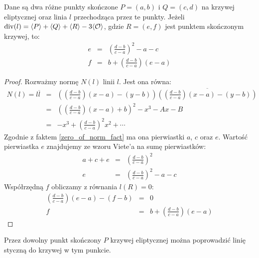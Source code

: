 \begin{theorem}
Dane są dwa różne punkty skończone $P = (a, b)$ i $Q = (c, d)$
na krzywej eliptycznej oraz linia $l$ przechodząca przez te punkty.
Jeżeli $\operatorname{div}(l) = \langle P\rangle + \langle Q\rangle + \langle R\rangle - 3\langle\mathcal{O}\rangle$,
gdzie $R = (e, f)$ jest punktem skończonym krzywej,
to:
\begin{eqnarray}
\label{chord_line_third_point_x_eqn}
e & = & \left(\frac{d-b}{c-a}\right)^2 - a - c \\
\label{chord_line_third_point_y_eqn}
f & = & b + \left(\frac{d-b}{c-a}\right)(e-a)
\end{eqnarray}
\end{theorem}

\begin{proof}
Rozważmy normę $N(l)$ linii $l$. Jest ona równa:
\begin{eqnarray*}
N(l) = l\overline{l}
& = & \left(\left(\frac{d-b}{c-a}\right)(x - a) - (y - b)\right)
      \overline{\left(\left(\frac{d-b}{c-a}\right)(x - a) - (y - b)\right)} \\
& = & \left(\left(\frac{d-b}{c-a}\right)(x-a) + b\right)^2 - x^3 - Ax - B \\
& = & -x^3 + \left(\frac{d-b}{c-a}\right)^2x^2 + \cdots
\end{eqnarray*}
Zgodnie z faktem \ref{zero_of_norm_fact}
ma ona pierwiastki $a$, $c$ oraz $e$.
Wartość pierwiastka $e$ znajdujemy ze wzoru Viete'a na sumę pierwiastków:
\begin{eqnarray*}
a + c + e & = & \left(\frac{d-b}{c-a}\right)^2 \\
        e & = & \left(\frac{d-b}{c-a}\right)^2 - a - c
\end{eqnarray*}
Współrzędną $f$ obliczamy z równania $l(R) = 0$:
\begin{eqnarray*}
\left(\frac{d-b}{c-a}\right)(e - a) - (f - b) & = & 0 \\
f & = & b + \left(\frac{d-b}{c-a}\right)(e-a)
\end{eqnarray*}
\end{proof}

\begin{theorem}\label{line_tangent_at_point_theorem}
Przez dowolny punkt skończony $P$ krzywej eliptycznej
można poprowadzić linię styczną do krzywej w tym punkcie.
\end{theorem}


